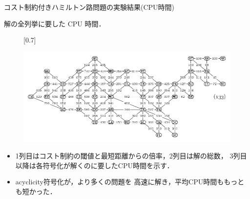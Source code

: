 \documentclass[dvipdfmx,10pt]{beamer}
\begin{document}
\begin{frame}{コスト制約付きハミルトン路問題の実験結果(CPU時間)}
\begin{block}{}
  \centering
  解の全列挙に要した CPU 時間．
\end{block}
\begin{figure}[h]
  \def\@captype{table}
  \begin{minipage}[c]{.48\textwidth}
    \begin{center}
      \scalebox{0.7}[0.7]{
        
      }
    \end{center}

  \end{minipage}
  \hfill
  \begin{minipage}[c]{.48\textwidth}
    \raggedleft
    \includegraphics[width=0.7\linewidth]{fig/taocp_vol4fasc1b_p52_eq133.pdf}
  \end{minipage}
\end{figure}
\begin{itemize}
\item 1列目はコスト制約の閾値と最短距離からの倍率，2列目は解の総数，
  3列目以降は各符号化が解くのに要したCPU時間を示す．
\item \textsf{acyclicity}符号化が，より多くの問題を
  高速に解き，平均CPU時間ももっとも短かった．
\end{itemize}  
\end{frame}
\end{document}

